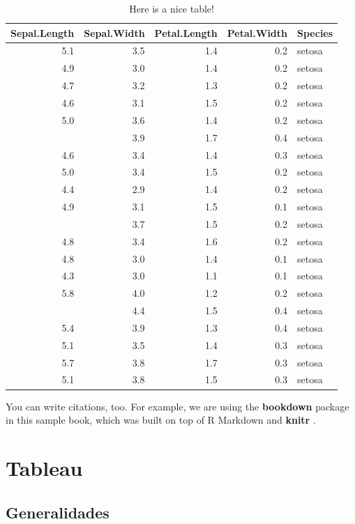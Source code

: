 \documentclass[
]{book}
\begin{document}
\begin{table}

\caption{\label{tab:nice-tab}Here is a nice table!}
\centering
\begin{tabular}[t]{rrrrl}
\toprule
Sepal.Length & Sepal.Width & Petal.Length & Petal.Width & Species\\
\midrule
5.1 & 3.5 & 1.4 & 0.2 & setosa\\
4.9 & 3.0 & 1.4 & 0.2 & setosa\\
4.7 & 3.2 & 1.3 & 0.2 & setosa\\
4.6 & 3.1 & 1.5 & 0.2 & setosa\\
5.0 & 3.6 & 1.4 & 0.2 & setosa\\
\addlinespace
5.4 & 3.9 & 1.7 & 0.4 & setosa\\
4.6 & 3.4 & 1.4 & 0.3 & setosa\\
5.0 & 3.4 & 1.5 & 0.2 & setosa\\
4.4 & 2.9 & 1.4 & 0.2 & setosa\\
4.9 & 3.1 & 1.5 & 0.1 & setosa\\
\addlinespace
5.4 & 3.7 & 1.5 & 0.2 & setosa\\
4.8 & 3.4 & 1.6 & 0.2 & setosa\\
4.8 & 3.0 & 1.4 & 0.1 & setosa\\
4.3 & 3.0 & 1.1 & 0.1 & setosa\\
5.8 & 4.0 & 1.2 & 0.2 & setosa\\
\addlinespace
5.7 & 4.4 & 1.5 & 0.4 & setosa\\
5.4 & 3.9 & 1.3 & 0.4 & setosa\\
5.1 & 3.5 & 1.4 & 0.3 & setosa\\
5.7 & 3.8 & 1.7 & 0.3 & setosa\\
5.1 & 3.8 & 1.5 & 0.3 & setosa\\
\bottomrule
\end{tabular}
\end{table}

You can write citations, too. For example, we are using the \textbf{bookdown} package \citep{R-bookdown} in this sample book, which was built on top of R Markdown and \textbf{knitr} \citep{xie2015}.

\hypertarget{tableau}{%
\chapter{Tableau}\label{tableau}}

\hypertarget{generalidades}{%
\section{Generalidades}\label{generalidades}}
\end{document}
